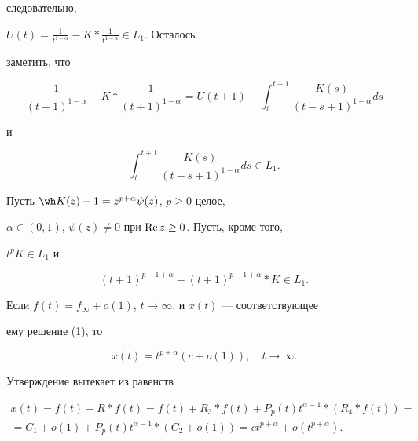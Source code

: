 следовательно, 


$U(t)=\frac{1}{t^{1-\alpha}}-K*\frac{1}{t^{1-\alpha}}\in L_1$. Осталось 


заметить, что 


$$ 


\frac{1}{(t+1)^{1-\alpha}}-K*\frac{1}{(t+1)^{1-\alpha}}= 


U(t+1)-\int^{t+1}_t\frac{K(s)}{(t-s+1)^{1-\alpha}}ds 


$$ 


и 


$$ 


\int^{t+1}_t\frac{K(s)}{(t-s+1)^{1-\alpha}}ds\in L_1. 


$$ 


 


\begin{cornonum} 


Пусть $\wh K(z)-1=z^{p+\alpha}\psi(z)$, $p\ge0$ целое, 


$\alpha\in(0,1)$, $\psi(z)\ne0$ при $\operatorname{Re} z\ge0$. Пусть, кроме того,


$t^p K\in L_1$ и 


\begin{equation} 


(t+1)^{p-1+\alpha}-(t+1)^{p-1+\alpha}*K\in L_1. 


\end{equation} 


Если $f(t)=f_\infty+o(1)$, $t\to\infty$, и $x(t)$ --- соответствующее 


ему решение (1), то 


\begin{equation} 


x(t)=t^{p+\alpha}(c+o(1)),\quad t\to\infty. 


\end{equation} 


Утверждение вытекает из равенств 


\begin{multline*} 


x(t)=f(t)+R*f(t)=f(t)+R_3*f(t)+P_p(t)t^{\alpha-1} 


*(R_4*f(t))= \\ 


% 


= C_1+o(1)+P_p(t)t^{\alpha-1}*(C_2+o(1))=c t^{p+\alpha} 


+o(t^{p+\alpha}). 


\end{multline*} 



\end{cornonum}

